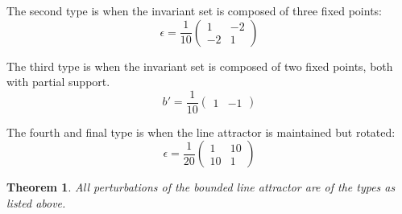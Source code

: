 \documentclass{article} %
\newcounter{ct}
\newtheorem{theorem}{Theorem}
\theoremstyle{definition}
\theoremstyle{remark}
\begin{document}
The second type is when the invariant set is composed of three fixed points:
\begin{equation}
\epsilon = \frac{1}{10}
\begin{pmatrix}
1  &  -2 \\
 -2  &  1
\end{pmatrix}
\end{equation}

The third type is when the invariant set is composed of two fixed points, both with partial support.
\begin{equation}
b' =  \frac{1}{10}
\begin{pmatrix}
1 & -1
\end{pmatrix}
\end{equation}

The fourth and final type is when the line attractor is maintained but rotated:
\begin{equation}
\epsilon =  \frac{1}{20}
\begin{pmatrix}
1 & 10\\
10 & 1
\end{pmatrix}
\end{equation}

\begin{theorem}
All perturbations of the bounded line attractor are of the types as listed above.
\end{theorem}
\end{document}

